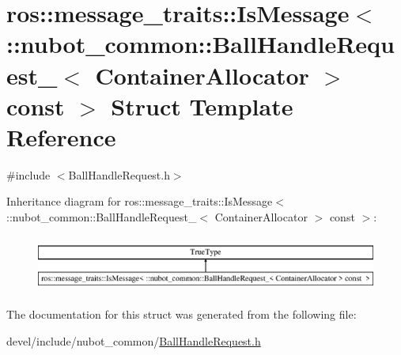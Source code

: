 \hypertarget{structros_1_1message__traits_1_1IsMessage_3_01_1_1nubot__common_1_1BallHandleRequest___3_01Contaad99cb5811a55b3ed8063a5cb054420a}{\section{ros\-:\-:message\-\_\-traits\-:\-:Is\-Message$<$ \-:\-:nubot\-\_\-common\-:\-:Ball\-Handle\-Request\-\_\-$<$ Container\-Allocator $>$ const $>$ Struct Template Reference}
\label{structros_1_1message__traits_1_1IsMessage_3_01_1_1nubot__common_1_1BallHandleRequest___3_01Contaad99cb5811a55b3ed8063a5cb054420a}
}


{\ttfamily \#include $<$Ball\-Handle\-Request.\-h$>$}

Inheritance diagram for ros\-:\-:message\-\_\-traits\-:\-:Is\-Message$<$ \-:\-:nubot\-\_\-common\-:\-:Ball\-Handle\-Request\-\_\-$<$ Container\-Allocator $>$ const $>$\-:\begin{figure}[H]
\begin{center}
\leavevmode
\includegraphics[height=1.882353cm]{structros_1_1message__traits_1_1IsMessage_3_01_1_1nubot__common_1_1BallHandleRequest___3_01Contaad99cb5811a55b3ed8063a5cb054420a}
\end{center}
\end{figure}


The documentation for this struct was generated from the following file\-:\begin{DoxyCompactItemize}
\item 
devel/include/nubot\-\_\-common/\hyperlink{BallHandleRequest_8h}{Ball\-Handle\-Request.\-h}\end{DoxyCompactItemize}
